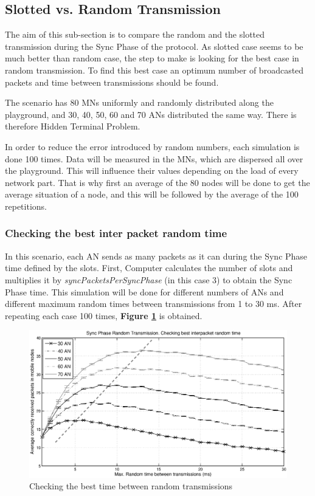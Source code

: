 \subsection{Slotted vs. Random Transmission}

The aim of this sub-section is to compare the random and the slotted transmission during the Sync Phase of the protocol. As slotted case seems to be
much better than random case, the step to make is looking for the best case in random transmission. To find this best case an optimum number
of broadcasted packets and time between transmissions should be found.

The scenario has 80 \acp{MN} uniformly and randomly distributed along the playground, and 30, 40, 50, 60 and 70 \acp{AN} distributed the same way.
There is therefore Hidden Terminal Problem.

In order to reduce the error introduced by random numbers, each simulation is done 100 times. Data will be measured in the \acp{MN}, which
are dispersed all over the playground. This will influence their values depending on the load of every network part. That is why first 
an average of the 80 nodes will be done to get the average situation of a node, and this will be followed by the average of the 100 repetitions.

\subsubsection{Checking the best inter packet random time}

In this scenario, each \ac{AN} sends as many packets as it can during the Sync Phase time defined by the slots. First, Computer calculates the number of
slots and multiplies it by \textit{syncPacketsPerSyncPhase} (in this case 3) to obtain the Sync Phase time. This simulation will be done for different
numbers of \acp{AN} and different maximum random times between transmissions from 1 to 30 ms. After repeating each case 100 times,
\textbf{Figure \ref{fig:randomTimeCheckingTheBestInterpacketRandomTime}} is obtained.

\begin{figure}[ht]
 \begin{center}
  \includegraphics[width=1\textwidth]{randomTimeCheckingTheBestInterpacketRandomTime.eps}
 \end{center}
 \caption{Checking the best time between random transmissions}
 \label{fig:randomTimeCheckingTheBestInterpacketRandomTime}
\end{figure}

